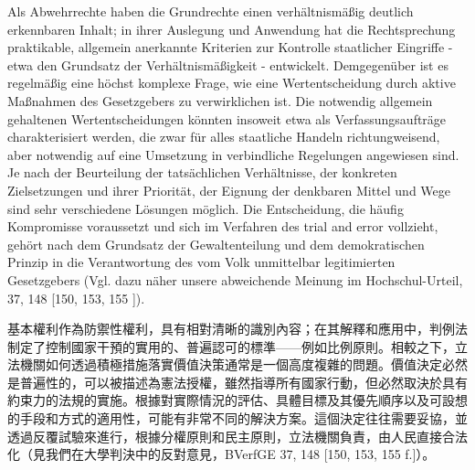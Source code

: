 \documentclass[12pt]{article}
\begin{document}
\syncleft
\begin{sourcepara}
Als Abwehrrechte haben die Grundrechte einen verhältnismäßig deutlich erkennbaren Inhalt; in ihrer Auslegung und Anwendung hat die Rechtsprechung praktikable, allgemein anerkannte Kriterien zur Kontrolle staatlicher Eingriffe - etwa den Grundsatz der Verhältnismäßigkeit - entwickelt. Demgegenüber ist es regelmäßig eine höchst komplexe Frage, wie eine Wertentscheidung durch aktive Maßnahmen des Gesetzgebers zu verwirklichen ist. Die notwendig allgemein gehaltenen Wertentscheidungen könnten insoweit etwa als Verfassungsaufträge charakterisiert werden, die zwar für alles staatliche Handeln richtungweisend, aber notwendig auf eine Umsetzung in verbindliche Regelungen angewiesen sind. Je nach der Beurteilung der tatsächlichen Verhältnisse, der konkreten Zielsetzungen und ihrer Priorität, der Eignung der denkbaren Mittel und Wege sind sehr verschiedene Lösungen möglich. Die Entscheidung, die häufig Kompromisse voraussetzt und sich im Verfahren des trial and error vollzieht, gehört nach dem Grundsatz der Gewaltenteilung und dem demokratischen Prinzip in die Verantwortung des vom Volk unmittelbar legitimierten Gesetzgebers (Vgl. dazu näher unsere abweichende Meinung im Hochschul-Urteil, \abbrBVerfGE{} 37, 148 [150, 153, 155 \abbrF{}]).
\end{sourcepara}
\begin{transpara}
基本權利作為防禦性權利，具有相對清晰的識別內容；在其解釋和應用中，判例法制定了控制國家干預的實用的、普遍認可的標準——例如比例原則。相較之下，立法機關如何透過積極措施落實價值決策通常是一個高度複雜的問題。價值決定必然是普遍性的，可以被描述為憲法授權，雖然指導所有國家行動，但必然取決於具有約束力的法規的實施。根據對實際情況的評估、具體目標及其優先順序以及可設想的手段和方式的適用性，可能有非常不同的解決方案。這個決定往往需要妥協，並透過反覆試驗來進行，根據分權原則和民主原則，立法機關負責，由人民直接合法化（見我們在大學判決中的反對意見，BVerfGE 37, 148 [150, 153, 155 f.]）。
\end{transpara}
\end{document}
